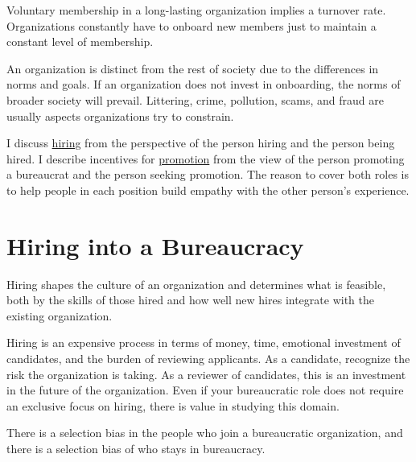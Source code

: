 

Voluntary membership in a long-lasting organization implies a turnover rate. Organizations constantly have to onboard new members just to maintain a constant level of membership.

An organization is distinct from the rest of society due to the differences in norms and goals. If an organization does not invest in onboarding, the norms of broader society will prevail. Littering, crime, pollution, scams, and fraud are usually aspects organizations try to constrain.

I discuss \hyperref[sec:hiring]{hiring}\iftoggle{haspagenumbers}{ (see page~\pageref{sec:hiring})}{}
from  the perspective of the person hiring and the person being hired. 
I describe incentives for \hyperref[sec:promotion]{promotion}\iftoggle{haspagenumbers}{ (see page~\pageref{sec:promotion})}{}
from  the view of the person promoting a bureaucrat and the person seeking promotion. 
The reason to cover both roles is to help people in each position build empathy with the other person's experience. 


\section{Hiring into a Bureaucracy\label{sec:hiring}}


Hiring shapes the culture of an organization and determines what is feasible, both by the skills of those hired and how well new hires integrate with the existing organization. 

Hiring is an expensive process in terms of money, time, emotional investment of candidates, and the burden of reviewing applicants. 
As a candidate, recognize the risk the organization is taking. 
As a reviewer of candidates, this is an investment in the future of the organization. Even if your bureaucratic role does not require an exclusive focus on hiring, there is value in studying this domain. 

There is a selection bias in the people who join a bureaucratic organization, and there is a selection bias of who stays in bureaucracy. 


